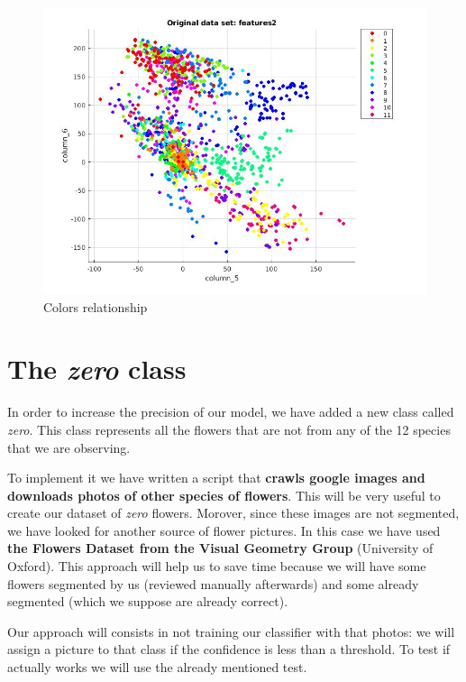 \documentclass[11]{article}
\begin{document}
\begin{figure}[H]
    \centering
  \includegraphics[scale=0.22]{images/colors.jpg}
    \caption{Colors relationship}
\end{figure}




\section{The \textit{zero} class}

In order to increase the precision of our model, we have added a new class called \textit{zero}. This class represents all the flowers that are not from any of the 12 species that we are observing.
\medskip

To implement it we have written a script that \textbf{crawls google images and downloads photos of other species of flowers}. This will be very useful to create our dataset of \textit{zero} flowers. Morover, since these images are not segmented, we have looked for another source of flower pictures. In this case we have used \textbf{the Flowers Dataset from the Visual Geometry Group} (University of Oxford)\cite{Flower dataset}. This approach will help us to save time because we will have some flowers segmented by us (reviewed manually afterwards) and some already segmented (which we suppose are already correct).
\medskip

Our approach will consists in not training our classifier with that photos: we will assign a picture to that class if the confidence is less than a threshold. To test if actually works we will use the already mentioned test. 
\end{document}
